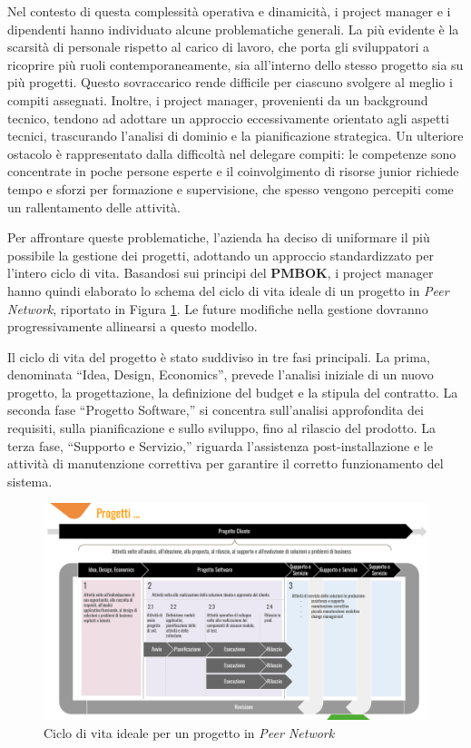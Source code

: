 Nel contesto di questa complessità operativa e dinamicità, i project manager e i dipendenti hanno individuato alcune problematiche generali.
La più evidente è la scarsità di personale rispetto al carico di lavoro, che porta gli sviluppatori a ricoprire più ruoli contemporaneamente,
sia all’interno dello stesso progetto sia su più progetti. Questo sovraccarico rende difficile per ciascuno svolgere al meglio i compiti assegnati.
Inoltre, i project manager, provenienti da un background tecnico, tendono ad adottare un approccio eccessivamente orientato agli aspetti tecnici,
trascurando l'analisi di dominio e la pianificazione strategica. Un ulteriore ostacolo è rappresentato dalla difficoltà nel delegare compiti: le
competenze sono concentrate in poche persone esperte e il coinvolgimento di risorse junior richiede tempo e sforzi per formazione e supervisione,
che spesso vengono percepiti come un rallentamento delle attività.

Per affrontare queste problematiche, l’azienda ha deciso di uniformare il più possibile la gestione dei progetti, adottando un approccio standardizzato
per l’intero ciclo di vita. Basandosi sui principi del \textbf{\ac{PMBOK}}\cite{project2021guide}, i project manager hanno quindi elaborato lo schema
del ciclo di vita ideale di un progetto in \textit{Peer Network}, riportato in Figura \ref{fig:fasi-progettuali}. Le future modifiche nella gestione dovranno
progressivamente allinearsi a questo modello.

Il ciclo di vita del progetto è stato suddiviso in tre fasi principali. La prima, denominata “Idea, Design, Economics”, prevede l’analisi iniziale di un
nuovo progetto, la progettazione, la definizione del budget e la stipula del contratto. La seconda fase “Progetto Software,” si concentra sull’analisi
approfondita dei requisiti, sulla pianificazione e sullo sviluppo, fino al rilascio del prodotto. La terza fase, “Supporto e Servizio,” riguarda l’assistenza
post-installazione e le attività di manutenzione correttiva per garantire il corretto funzionamento del sistema.

\begin{figure}
    \centering
    \includegraphics[width=\linewidth]{figures/FasiProgettualiPN.pdf}
    \caption{Ciclo di vita ideale per un progetto in \textit{Peer Network}}
    \label{fig:fasi-progettuali}
\end{figure}

